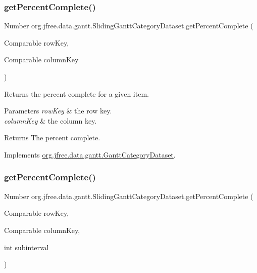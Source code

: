 \subsubsection{\texorpdfstring{get\+Percent\+Complete()}{getPercentComplete()}\hspace{0.1cm}{\footnotesize\ttfamily [1/4]}}
{\footnotesize\ttfamily Number org.\+jfree.\+data.\+gantt.\+Sliding\+Gantt\+Category\+Dataset.\+get\+Percent\+Complete (\begin{DoxyParamCaption}\item[{Comparable}]{row\+Key,  }\item[{Comparable}]{column\+Key }\end{DoxyParamCaption})}

Returns the percent complete for a given item.


\begin{DoxyParams}{Parameters}
{\em row\+Key} & the row key. \\
\hline
{\em column\+Key} & the column key.\\
\hline
\end{DoxyParams}
\begin{DoxyReturn}{Returns}
The percent complete. 
\end{DoxyReturn}


Implements \mbox{\hyperlink{interfaceorg_1_1jfree_1_1data_1_1gantt_1_1_gantt_category_dataset_aa5ddb721d32f80a587877db94589b9fd}{org.\+jfree.\+data.\+gantt.\+Gantt\+Category\+Dataset}}.

\mbox{\label{classorg_1_1jfree_1_1data_1_1gantt_1_1_sliding_gantt_category_dataset_a9e7ab75b0f52944a95c545052cc07149}} 
\subsubsection{\texorpdfstring{get\+Percent\+Complete()}{getPercentComplete()}\hspace{0.1cm}{\footnotesize\ttfamily [2/4]}}
{\footnotesize\ttfamily Number org.\+jfree.\+data.\+gantt.\+Sliding\+Gantt\+Category\+Dataset.\+get\+Percent\+Complete (\begin{DoxyParamCaption}\item[{Comparable}]{row\+Key,  }\item[{Comparable}]{column\+Key,  }\item[{int}]{subinterval }\end{DoxyParamCaption})}

